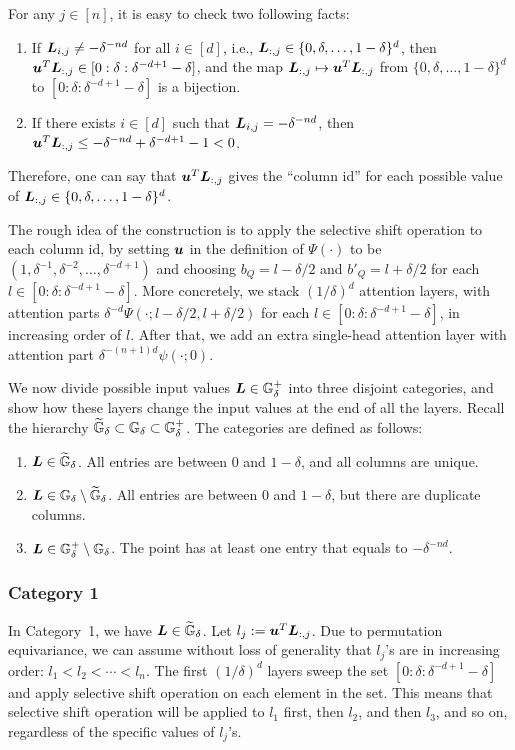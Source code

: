 For any $j \in [n]$, it is easy to check two following facts:
\begin{enumerate}
\item If ${\bm{L}}_{i,j} \neq -\delta^{-nd}$ for all $i \in [d]$, i.e., ${\bm{L}}_{:,j} \in \{0, \delta, \dots, 1-\delta\}^d$, then ${\bm{u}}^T {\bm{L}}_{:,j} \in [0:\delta:\delta^{-d+1} - \delta]$, and the map ${\bm{L}}_{:,j} \mapsto {\bm{u}}^T {\bm{L}}_{:,j}$ from $\{0, \delta, \dots, 1-\delta\}^d$ to $[0:\delta:\delta^{-d+1} - \delta]$ is a bijection.
\item If there exists $i \in [d]$ such that ${\bm{L}}_{i,j} = -\delta^{-nd}$, then ${\bm{u}}^T {\bm{L}}_{:,j} \leq -\delta^{-nd} + \delta^{-d+1} - 1 < 0$.
\end{enumerate}
Therefore, one can say that ${\bm{u}}^T {\bm{L}}_{:,j}$ gives the ``column id'' for each possible value of ${\bm{L}}_{:,j} \in \{0, \delta, \dots, 1-\delta\}^d$.

The rough idea of the construction is to apply the selective shift operation to each column id, by setting ${\bm{u}}$ in the definition of $\Psi(\cdot)$ to be $(1, \delta^{-1}, \delta^{-2}, \dots, \delta^{-d+1})$ and choosing $b_Q = l - \delta/2$ and $b'_Q = l + \delta/2$ for each $l \in [0:\delta:\delta^{-d+1} - \delta]$.
More concretely, we stack $(1/\delta)^d$ attention layers, with attention parts $\delta^{-d} \Psi(\cdot;l-\delta/2,l+\delta/2)$ for each $l \in [0:\delta:\delta^{-d+1} - \delta]$, in increasing order of $l$.
After that, we add an extra single-head attention layer with attention part $\delta^{-(n+1)d} \psi(\cdot;0)$.

We now divide possible input values ${\bm{L}} \in {\mathbb{G}}^+_{\delta}$ into three disjoint categories, and show how these layers change the input values at the end of all the layers. Recall the hierarchy $\widetilde{{\mathbb{G}}}_{\delta} \subset {\mathbb{G}}_{\delta} \subset {\mathbb{G}}^+_{\delta}$. The categories are defined as follows: 
\begin{enumerate}
    \item ${\bm{L}} \in \widetilde{{\mathbb{G}}}_{\delta}$. All entries are between $0$ and $1-\delta$, and all columns are unique.
    \item ${\bm{L}} \in {\mathbb{G}}_{\delta} \setminus \widetilde{{\mathbb{G}}}_{\delta}$. All entries are between $0$ and $1-\delta$, but there are duplicate columns.
    \item ${\bm{L}} \in {\mathbb{G}}^+_{\delta} \setminus {\mathbb{G}}_{\delta}$. The point has at least one entry that equals to $-\delta^{-nd}$.
\end{enumerate}

\subsubsection{Category 1}
\label{sec:proof-category1}
In Category~1, we have ${\bm{L}} \in \widetilde{{\mathbb{G}}}_{\delta}$.
Let $l_j := {\bm{u}}^T {\bm{L}}_{:,j}$.
Due to permutation equivariance, we can assume without loss of generality that $l_j$'s are in increasing order: $l_1 < l_2 < \cdots < l_n$.
The first $(1/\delta)^d$ layers sweep the set $[0:\delta:\delta^{-d+1}-\delta]$ and apply selective shift operation on each element in the set. This means that selective shift operation will be applied to $l_1$ first, then $l_2$, and then $l_3$, and so on, regardless of the specific values of $l_j$'s.


